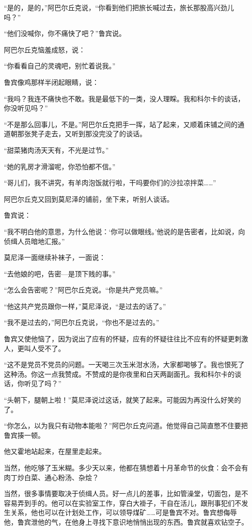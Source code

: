 “是的，是的，”阿巴尔丘克说，“你看到他们把旅长喊过去，旅长那股高兴劲儿吗？”

“他们没喊你，你不痛快了吧？”鲁宾说。

阿巴尔丘克恼羞成怒，说：

“你看看自己的灵魂吧，别忙着说我。”

鲁宾像鸡那样半闭起眼睛，说：

“我吗？我连不痛快也不敢。我是最低下的一类，没人理睬。我和科尔卡的谈话，你没听见吗？”

“不是那么回事儿，不是。”阿巴尔丘克把手一挥，站了起来，又顺着床铺之间的通道朝那张凳子走去，又听到那没完没了的谈话。

“甜菜猪肉汤天天有，不光是过节。”

“她的乳房才滑溜呢，你恐怕都不信。”

“哥儿们，我不讲究，有羊肉泡饭就行啦，干吗要你们的沙拉凉拌菜……”

阿巴尔丘克又回到莫尼泽的铺前，坐下来，听别人谈话。

鲁宾说：

“我不明白他的意思，为什么他说：‘你可以做眼线。’他说的是告密者，比如说，向侦缉人员暗地汇报。”

莫尼泽一面继续补袜子，一面说：

“去他娘的吧，告密—是顶下贱的事。”

“怎么会告密呢？”阿巴尔丘克说。“你是共产党员嘛。”

“他这共产党员跟你一样，”莫尼泽说，“是过去的话了。”

“我不是过去的，”阿巴尔丘克说，“你也不是过去的。”

鲁宾又使他恼了，因为说出了应有的怀疑，应有的怀疑往往比不应有的怀疑更刺激人，更叫人受不了。

“这不是党员不党员的问题。一天喝三次玉米泔水汤，大家都喝够了。我也恨死了这种汤。你这一点我赞成。不赞成的是你夜里和白天两副面孔。我和科尔卡的谈话，你听见了吗？”

“头朝下，腿朝上啦！”莫尼泽说过这话，就笑了起来。可能因为再没什么好笑的了。

“你怎么，以为我只有动物本能啦？”阿巴尔丘克问道。他觉得自己简直憋不住要把鲁宾揍一顿。

他又霍地站起来，在屋里走起来。

当然，他吃够了玉米糊。多少天以来，他都在猜想着十月革命节的伙食：会不会有肉丁炒白菜、通心粉汤、杂烩？

当然，很多事情要取决于侦缉人员。好一点儿的差事，比如管澡堂，切面包，是不容易弄到手的。他可以在实验室工作，穿白大褂子，干自在活儿，跟刑事犯们不发生关系，他也可以在计划处工作，可以领导煤矿……可是鲁宾不对。鲁宾想侮辱他，鲁宾泄他的气，在他身上寻找下意识地悄悄出现的东西。鲁宾就喜欢钻空子。

